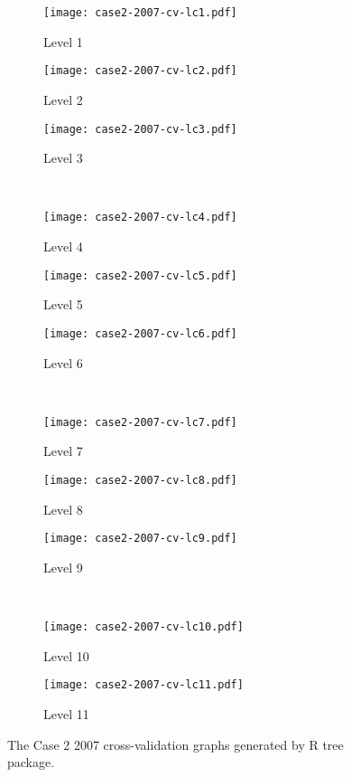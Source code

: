 \begin{appendices}
\begin{figure}[!ht] \centering
	\captionsetup[subfigure]{width=2.0in}
	\begin{subfigure}[t]{0.32\textwidth}
		\texttt{[image: case2-2007-cv-lc1.pdf]}
		\caption{Level 1}
	\end{subfigure}
	\begin{subfigure}[t]{0.32\textwidth}
		\texttt{[image: case2-2007-cv-lc2.pdf]}
		\caption{Level 2}
	\end{subfigure}
	\begin{subfigure}[t]{0.32\textwidth}
		\texttt{[image: case2-2007-cv-lc3.pdf]}
		\caption{Level 3}
	\end{subfigure}\\
	\vspace{5pt}
	\begin{subfigure}[t]{0.32\textwidth}
		\texttt{[image: case2-2007-cv-lc4.pdf]}
		\caption{Level 4}
	\end{subfigure}
	\begin{subfigure}[t]{0.32\textwidth}
		\texttt{[image: case2-2007-cv-lc5.pdf]}
		\caption{Level 5}
	\end{subfigure}
	\begin{subfigure}[t]{0.32\textwidth}
		\texttt{[image: case2-2007-cv-lc6.pdf]}
		\caption{Level 6}
	\end{subfigure}\\
	\vspace{5pt}	
	\begin{subfigure}[t]{0.32\textwidth}
		\texttt{[image: case2-2007-cv-lc7.pdf]}
		\caption{Level 7}
	\end{subfigure}
	\begin{subfigure}[t]{0.32\textwidth}
		\texttt{[image: case2-2007-cv-lc8.pdf]}
		\caption{Level 8}
	\end{subfigure}
	\begin{subfigure}[t]{0.32\textwidth}
		\texttt{[image: case2-2007-cv-lc9.pdf]}
		\caption{Level 9}
	\end{subfigure}\\
	\vspace{5pt}
	\begin{subfigure}[t]{0.32\textwidth}
		\texttt{[image: case2-2007-cv-lc10.pdf]}
		\caption{Level 10}
	\end{subfigure}
	\begin{subfigure}[t]{0.32\textwidth}
		\texttt{[image: case2-2007-cv-lc11.pdf]}
		\caption{Level 11}
	\end{subfigure}
	\vspace{5pt}
	\caption[The Case 2 2007 cross-validation graphs generated by R tree package.]{The Case 2 2007 cross-validation graphs generated by R tree package.}
	\label{fig: appendix-fig.c10.cv}
\end{figure}


\end{appendices}
